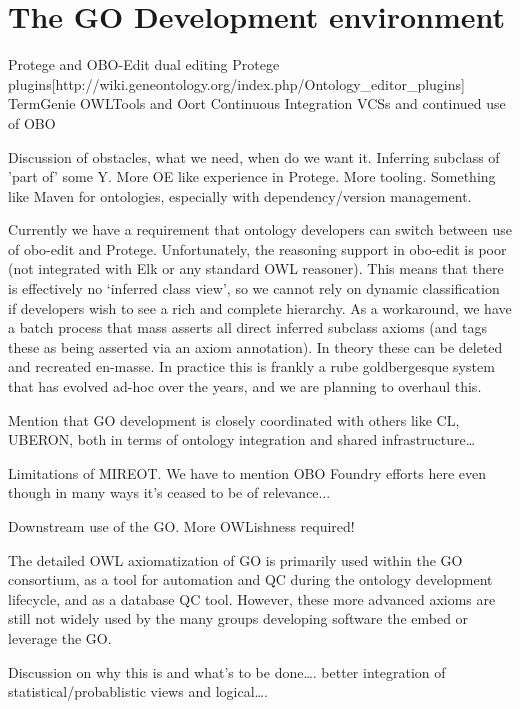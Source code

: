 \documentclass{llncs}
\begin{document}
\section{The GO Development environment}



Protege and OBO-Edit\cite{Day-Richter2007} dual editing
Protege plugins[http://wiki.geneontology.org/index.php/Ontology\_editor\_plugins]
TermGenie\cite{Dietze2014}
OWLTools and Oort
Continuous Integration\cite{Mungall2012a}
VCSs and continued use of OBO

Discussion of obstacles, what we need, when do we want it. Inferring subclass of 'part of' some Y. More OE like experience in Protege. More tooling. Something like Maven for ontologies, especially with dependency/version management.

Currently we have a requirement that ontology developers can switch between use of obo-edit and Protege. Unfortunately, the reasoning support in obo-edit is poor (not integrated with Elk or any standard OWL reasoner). This means that there is effectively no ‘inferred class view’, so we cannot rely on dynamic classification if developers wish to see a rich and complete hierarchy. As a workaround, we have a batch process that mass asserts all direct inferred subclass axioms (and tags these as being asserted via an axiom annotation). In theory these can be deleted and recreated en-masse. In practice this is frankly a rube goldbergesque system that has evolved ad-hoc over the years, and we are planning to overhaul this.

Mention that GO development is closely coordinated with others like CL, UBERON, both in terms of ontology integration and shared infrastructure…

Limitations of MIREOT. We have to mention OBO Foundry efforts here even though in many ways it’s ceased to be of relevance...

Downstream use of the GO. More OWLishness required!

The detailed OWL axiomatization of GO is primarily used within the GO consortium, as a tool for automation and QC during the ontology development lifecycle, and as a database QC tool. However, these more advanced axioms are still not widely used by the many groups developing software the embed or leverage the GO.

Discussion on why this is and what’s to be done…. better integration of statistical/probablistic views and logical….
\end{document}
